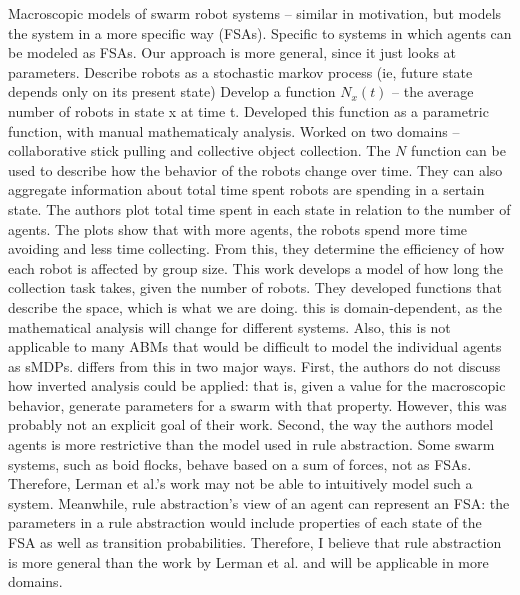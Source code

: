 Macroscopic models of swarm robot systems \cite{lerman2002mmf}\cite{lerman2005rpm} -- similar in motivation, but models the system in a more specific way (FSAs). Specific to systems in which agents can be modeled as FSAs. Our approach is more general, since it just looks at parameters.
Describe robots as a stochastic markov process (ie, future state depends only on its present state)
Develop a function $N_x(t)$ -- the average number of robots in state x at time t.
Developed this function as a parametric function, with manual mathematicaly analysis.
Worked on two domains -- collaborative stick pulling and collective object collection.
The $N$ function can be used to describe how the behavior of the robots change over time.
They can also aggregate information about total time spent robots are spending in a sertain state.
The authors plot total time spent in each state in relation to the number of agents.
The plots show that with more agents, the robots spend more time avoiding and less time collecting.
From this, they determine the efficiency of how each robot is affected by group size.
This work develops a model of how long the collection task takes, given the number of robots.
They developed functions that describe the space, which is what we are doing.
this is domain-dependent, as the mathematical analysis will change for different systems.
Also, this is not applicable to many ABMs that would be difficult to model the individual agents as sMDPs.
\fw differs from this in two major ways. First, the authors do not discuss how inverted analysis could be applied:
that is, given a value for the macroscopic behavior, generate parameters for a swarm with that property. However,
this was probably not an explicit goal of their work.
Second, the way the authors model agents is more restrictive than the model used in rule abstraction. Some swarm systems,
such as boid flocks, behave based on a sum of forces, not as FSAs. Therefore, Lerman et al.'s work may not be able to intuitively
model such a system. Meanwhile, rule abstraction's view of an agent can represent an FSA:
the parameters in a rule abstraction would include properties of each state of the FSA as well as transition probabilities.
Therefore, I believe that rule abstraction is more general than the work by Lerman et al. and will be applicable in more domains.


